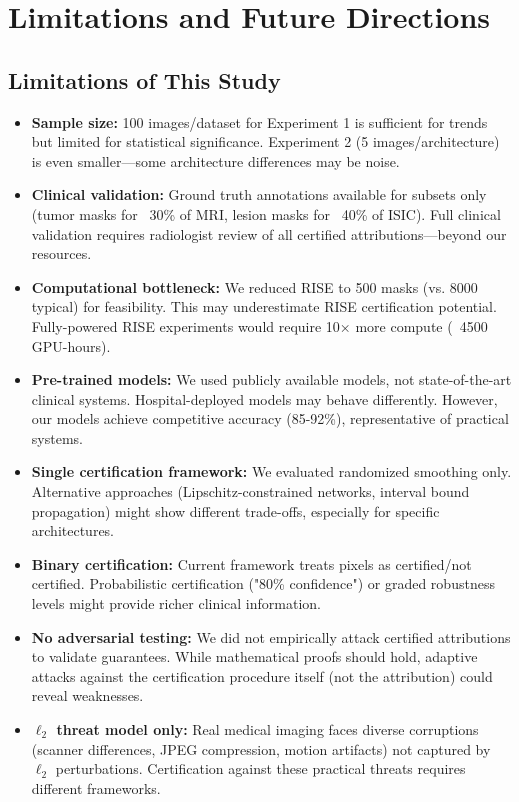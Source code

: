 \documentclass[11pt]{article}
\begin{document}
\section{Limitations and Future Directions}

\subsection{Limitations of This Study}

\begin{itemize}
    \item \textbf{Sample size:} 100 images/dataset for Experiment 1 is sufficient for trends but limited for statistical significance. Experiment 2 (5 images/architecture) is even smaller—some architecture differences may be noise.
    
    \item \textbf{Clinical validation:} Ground truth annotations available for subsets only (tumor masks for ~30\% of MRI, lesion masks for ~40\% of ISIC). Full clinical validation requires radiologist review of all certified attributions—beyond our resources.
    
    \item \textbf{Computational bottleneck:} We reduced RISE to 500 masks (vs. 8000 typical) for feasibility. This may underestimate RISE certification potential. Fully-powered RISE experiments would require 10× more compute (~4500 GPU-hours).
    
    \item \textbf{Pre-trained models:} We used publicly available models, not state-of-the-art clinical systems. Hospital-deployed models may behave differently. However, our models achieve competitive accuracy (85-92\%), representative of practical systems.
    
    \item \textbf{Single certification framework:} We evaluated randomized smoothing only. Alternative approaches (Lipschitz-constrained networks, interval bound propagation) might show different trade-offs, especially for specific architectures.
    
    \item \textbf{Binary certification:} Current framework treats pixels as certified/not certified. Probabilistic certification ("80\% confidence") or graded robustness levels might provide richer clinical information.
    
    \item \textbf{No adversarial testing:} We did not empirically attack certified attributions to validate guarantees. While mathematical proofs should hold, adaptive attacks against the certification procedure itself (not the attribution) could reveal weaknesses.
    
    \item \textbf{$\ell_2$ threat model only:} Real medical imaging faces diverse corruptions (scanner differences, JPEG compression, motion artifacts) not captured by $\ell_2$ perturbations. Certification against these practical threats requires different frameworks.
\end{itemize}
\end{document}
